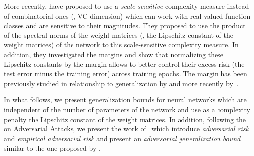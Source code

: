 More recently, \citet{bartlett2017spectrally} have proposed to use a \emph{scale-sensitive} complexity measure instead of combinatorial ones (\ie, VC-dimension) which can work with real-valued function classes and are sensitive to their magnitudes.
They proposed to use the product of the spectral norms of the weight matrices (\ie, the Lipschitz constant of the weight matrices) of the network to this scale-sensitive complexity measure.
In addition, they investigated the margins and show that normalizing these Lipschitz constants by the margin allows to better control their excess risk (the test error minus the training error) across
training epochs.
The margin has been previously studied in relationship to generalization by \citet{langford2002pac} and more recently by~\citet{neyshabur2018pacbayesian}.

In what follows, we present generalization bounds for neural networks which are independent of the number of parameters of the network and use as a complexity penalty the Lipschitz constant of the weight matrices.
In addition, following the  on Adversarial Attacks, we present the work of~\citet{farnia2018generalizable} which introduce \emph{adversarial risk} and \emph{empirical adversarial risk} and present an \emph{adversarial generalization bound} similar to the one proposed by \citet{bartlett2017spectrally}.

